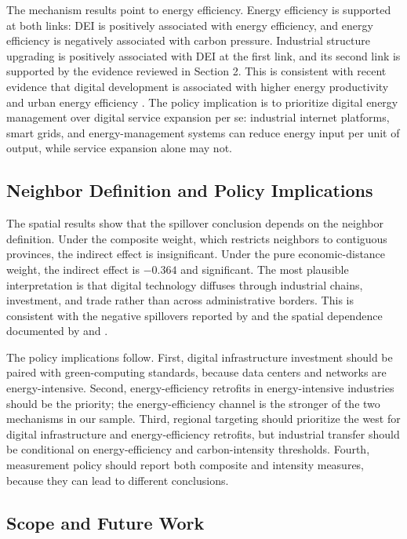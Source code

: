 \documentclass[economies,article,submit,moreauthors]{Definitions/mdpi}
\begin{document}
The mechanism results point to energy efficiency. Energy efficiency is supported at both links: DEI is positively associated with energy efficiency, and energy efficiency is negatively associated with carbon pressure. Industrial structure upgrading is positively associated with DEI at the first link, and its second link is supported by the evidence reviewed in Section 2. This is consistent with recent evidence that digital development is associated with higher energy productivity and urban energy efficiency \citep{ma2024,wang2025energy}. The policy implication is to prioritize digital energy management over digital service expansion per se: industrial internet platforms, smart grids, and energy-management systems can reduce energy input per unit of output, while service expansion alone may not.

\subsection{Neighbor Definition and Policy Implications}

The spatial results show that the spillover conclusion depends on the neighbor definition. Under the composite weight, which restricts neighbors to contiguous provinces, the indirect effect is insignificant. Under the pure economic-distance weight, the indirect effect is $-0.364$ and significant. The most plausible interpretation is that digital technology diffuses through industrial chains, investment, and trade rather than across administrative borders. This is consistent with the negative spillovers reported by \citet{yuan2024} and the spatial dependence documented by \citet{wang2025} and \citet{niu2024}.

The policy implications follow. First, digital infrastructure investment should be paired with green-computing standards, because data centers and networks are energy-intensive. Second, energy-efficiency retrofits in energy-intensive industries should be the priority; the energy-efficiency channel is the stronger of the two mechanisms in our sample. Third, regional targeting should prioritize the west for digital infrastructure and energy-efficiency retrofits, but industrial transfer should be conditional on energy-efficiency and carbon-intensity thresholds. Fourth, measurement policy should report both composite and intensity measures, because they can lead to different conclusions.

\subsection{Scope and Future Work}
\end{document}

